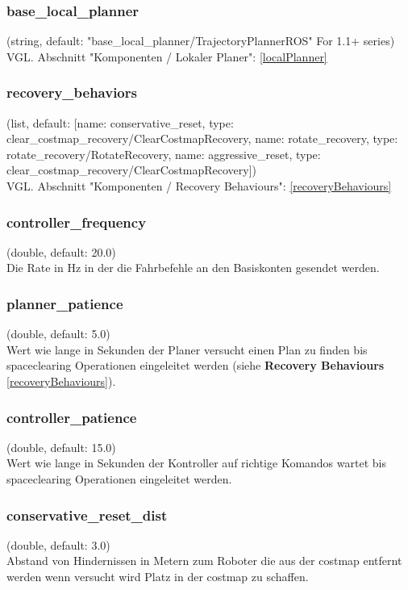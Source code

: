 \documentclass[oribibl]{llncs}
\begin{document}
\subsubsection{base\_local\_planner} (string, default: "base\_local\_planner/TrajectoryPlannerROS" For 1.1+ series)\\
   VGL. Abschnitt "Komponenten / Lokaler Planer": \ref{localPlanner}

\subsubsection{recovery\_behaviors} (list, default: [{name: conservative\_reset, type: clear\_costmap\_recovery/ClearCostmapRecovery}, {name: rotate\_recovery, type: rotate\_recovery/RotateRecovery}, {name: aggressive\_reset, type: clear\_costmap\_recovery/ClearCostmapRecovery}])\\
   VGL. Abschnitt "Komponenten / Recovery Behaviours": \ref{recoveryBehaviours}
   
\subsubsection{controller\_frequency} (double, default: 20.0)\\
	Die Rate in Hz in der die Fahrbefehle an den Basiskonten gesendet werden.
	
\subsubsection{planner\_patience} (double, default: 5.0)\\
	Wert wie lange in Sekunden der Planer versucht einen Plan zu finden bis spaceclearing Operationen eingeleitet werden (siehe \textbf{Recovery Behaviours} \ref{recoveryBehaviours}).
	
\subsubsection{controller\_patience} (double, default: 15.0)\\
	Wert wie lange in Sekunden der Kontroller auf richtige Komandos wartet bis spaceclearing Operationen eingeleitet werden.
	
\subsubsection{conservative\_reset\_dist} (double, default: 3.0)\\
	Abstand von Hindernissen in Metern zum Roboter die aus der costmap entfernt	werden wenn versucht wird Platz in der costmap zu schaffen.
	
\end{document}
